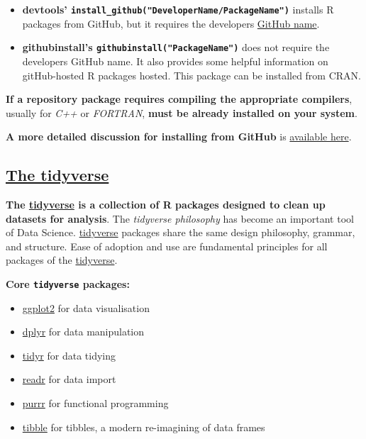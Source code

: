 \documentclass[]{book}
\providecommand{\tightlist}{%
  \setlength{\itemsep}{0pt}\setlength{\parskip}{0pt}}
\theoremstyle{definition}
\theoremstyle{definition}
\theoremstyle{definition}
\theoremstyle{remark}
\begin{document}
\begin{itemize}
\item
  \textbf{devtools'
  \texttt{install\_github("DeveloperName/PackageName")}} installs R
  packages from GitHub, but it requires the developers
  \href{https://help.github.com/articles/setting-your-username-in-git/}{GitHub
  name}.
\item
  \textbf{githubinstall's \texttt{githubinstall("PackageName")}} does
  not require the developers GitHub name. It also provides some helpful
  information on gitHub-hosted R packages hosted. This package can be
  installed from CRAN.
\end{itemize}

\textbf{If a repository package requires compiling the appropriate
compilers}, usually for \emph{C++} or \emph{FORTRAN}, \textbf{must be
already installed on your system}.

\textbf{A more detailed discussion for installing from GitHub} is
\href{https://cran.r-project.org/web/packages/githubinstall/vignettes/githubinstall.html}{available
here}.

\hypertarget{the-tidyverse}{%
\subsection{\texorpdfstring{\href{https://www.tidyverse.org/}{The
tidyverse}}{The tidyverse}}\label{the-tidyverse}}

\textbf{The \href{https://www.tidyverse.org/}{tidyverse} is a collection
of R packages designed to clean up datasets for analysis}. The
\emph{tidyverse philosophy} has become an important tool of Data
Science. \href{https://www.tidyverse.org/}{tidyverse} packages share the
same design philosophy, grammar, and structure. Ease of adoption and use
are fundamental principles for all packages of the
\href{https://www.tidyverse.org/}{tidyverse}.

\textbf{Core \texttt{tidyverse} packages:}

\begin{itemize}
\tightlist
\item
  \href{http://ggplot2.tidyverse.org/}{ggplot2} for data visualisation
\item
  \href{http://dplyr.tidyverse.org/}{dplyr} for data manipulation
\item
  \href{http://tidyr.tidyverse.org/}{tidyr} for data tidying
\item
  \href{http://readr.tidyverse.org/}{readr} for data import
\item
  \href{http://purrr.tidyverse.org/}{purrr} for functional programming
\item
  \href{http://tibble.tidyverse.org/}{tibble} for tibbles, a modern
  re-imagining of data frames
\end{itemize}
\end{document}
